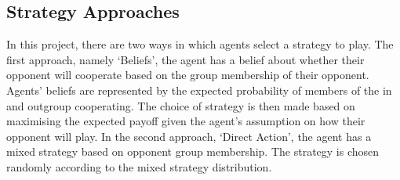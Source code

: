 \documentclass[]{llncs}
\begin{document}
 \subsection{Strategy Approaches}
 In this project, there are two ways in which agents select a strategy to play. The first approach, namely ‘Beliefs’, the agent has a belief about whether their opponent will cooperate based on the group membership of their opponent. Agents’ beliefs are represented by the expected probability of members of the in and outgroup cooperating. The choice of strategy is then made based on maximising the expected payoff given the agent’s assumption on how their opponent will play. In the second approach, ‘Direct Action’, the agent has a mixed strategy based on opponent group membership.  The strategy is chosen randomly according to the mixed strategy distribution.
 
\end{document}
